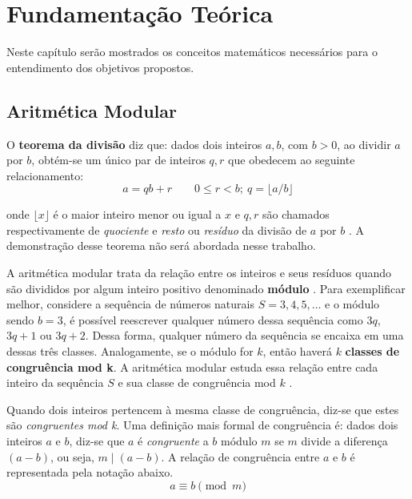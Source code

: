 \chapter{Fundamentação Teórica}
Neste capítulo serão mostrados os conceitos matemáticos necessários para o entendimento dos objetivos propostos.

%
%
\section{Aritmética Modular}

O \textbf{teorema da divisão} diz que: dados dois inteiros $a, b$, com $b > 0$, ao dividir \(a\) por \(b\), obtém-se um único par de inteiros $q, r$ que obedecem ao seguinte relacionamento:
\begin{equation}
  a=qb+r \qquad 0 \leq r<b;\ q=\lfloor a/b \rfloor
\end{equation}

onde $\lfloor x \rfloor$ é o maior inteiro menor ou igual a \(x\) e $q,r$ são chamados respectivamente de \textit{quociente} e \textit{resto} ou \textit{resíduo} da divisão de \(a\) por \(b\) \cite{Santos:2014}. A demonstração desse teorema não será abordada nesse trabalho.

A aritmética modular trata da relação entre os inteiros e seus resíduos quando são divididos por algum inteiro positivo denominado \textbf{módulo} \cite{Lewinter:2015}. Para exemplificar melhor, considere a sequência de números naturais $S = 3, 4, 5, \dots$ e o módulo sendo $b = 3$, é possível reescrever qualquer número dessa sequência como $3q$, $3q + 1$ ou $3q + 2$. Dessa forma, qualquer número da sequência se encaixa em uma dessas três classes. Analogamente, se o módulo for $k$, então haverá $k$ \textbf{classes de congruência mod k}. A aritmética modular estuda essa relação entre cada inteiro da sequência $S$ e sua classe de congruência mod \(k\) \cite{Lewinter:2015}.

Quando dois inteiros pertencem à mesma classe de congruência, diz-se que estes são \textit{congruentes mod k}. Uma definição mais formal de congruência é: dados dois inteiros \(a\) e \(b\), diz-se que \(a\) é \textit{congruente} a \(b\) módulo \(m\) se \(m\) divide a diferença $(a-b)$, ou seja, $m \mid (a-b)$. A relação de congruência entre \(a\) e \(b\) é representada pela notação abaixo.
\begin{equation}
  a \equiv b \pmod m \label{eq:1}
\end{equation}

